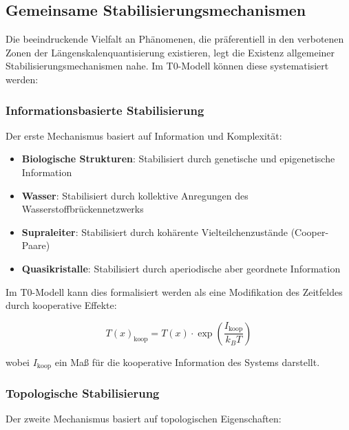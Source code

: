 \documentclass[12pt,a4paper]{article}
\newcommand{\Tfield}{T(x)}
\begin{document}
	\subsection{Gemeinsame Stabilisierungsmechanismen}
	\label{subsec:stabilisierungsmechanismen}
	
	Die beeindruckende Vielfalt an Phänomenen, die präferentiell in den verbotenen Zonen der Längen\-skalen\-quantisierung existieren, legt die Existenz allgemeiner Stabilisierungs\-mechanismen nahe. Im T0-Modell können diese systematisiert werden:
	
	\subsubsection{Informationsbasierte Stabilisierung}
	\label{subsubsec:info_stabilisierung}
	
	Der erste Mechanismus basiert auf Information und Komplexität:
	
	\begin{itemize}
		\item \textbf{Biologische Strukturen}: Stabilisiert durch genetische und epigenetische Information
		\item \textbf{Wasser}: Stabilisiert durch kollektive Anregungen des Wasserstoffbrückennetzwerks
		\item \textbf{Supraleiter}: Stabilisiert durch kohärente Vielteilchenzustände (Cooper-Paare)
		\item \textbf{Quasikristalle}: Stabilisiert durch aperiodische aber geordnete Information
	\end{itemize}
	
	Im T0-Modell kann dies formalisiert werden als eine Modifikation des Zeitfeldes durch kooperative Effekte:
	
	\begin{equation}
		\Tfield_{\text{koop}} = \Tfield \cdot \exp\left(\frac{I_{\text{koop}}}{k_B T}\right)
	\end{equation}
	
	wobei $I_{\text{koop}}$ ein Maß für die kooperative Information des Systems darstellt.
	
	\subsubsection{Topologische Stabilisierung}
	\label{subsubsec:topo_stabilisierung}
	
	Der zweite Mechanismus basiert auf topologischen Eigenschaften:
	
\end{document}
